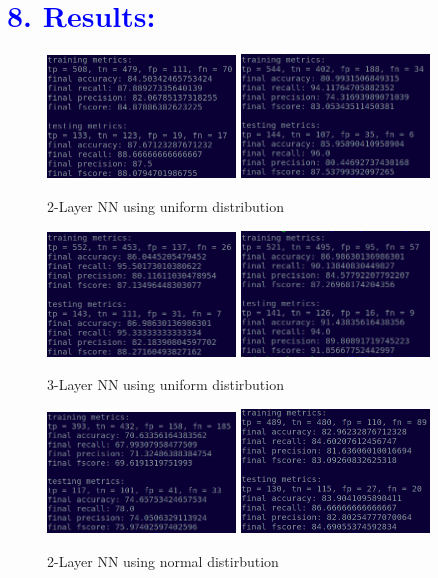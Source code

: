 \documentclass[a4paper,10pt,twoside]{article}
\begin{document}
\onecolumn
\section*{\textcolor{blue}{8. Results:}}
\begin{figure}[h!]
\centering
\includegraphics[scale=1.0, width=5cm]{Fig1.png}
\includegraphics[scale=1.0, width=5cm]{Fig2.png}
\caption*{2-Layer NN using uniform distribution}
\end{figure}

\begin{figure}[h!]
\centering
\includegraphics[scale=1.0, width=5cm]{Fig3.png}
\includegraphics[scale=1.0, width=5cm]{Fig4.png}
\caption*{3-Layer NN using uniform distirbution}
\end{figure}

\begin{figure}[h!]
\centering
\includegraphics[scale=1.0, width=5cm]{Fig5.png}
\includegraphics[scale=1.0, width=5cm]{Fig6.png}
\caption*{2-Layer NN using normal distirbution}
\end{figure}
\end{document}
